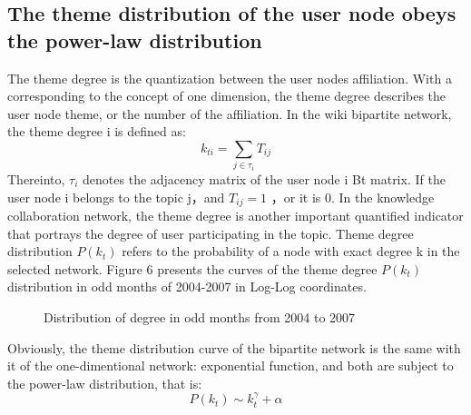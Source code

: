 \documentclass{elsarticle}
\begin{document}
\subsection{The theme distribution of the user node obeys the power-law distribution}
\label{sec:theme-distr-user}

The theme degree is the quantization between the user nodes
affiliation. With a corresponding to the concept of one dimension, the
theme degree describes the user node theme, or the number of the
affiliation. In the wiki bipartite network, the theme degree i is
defined as:
\begin{equation}
  \label{eq:1}
  k_{ti}=\sum_{j \in \tau_i} T_{ij}
\end{equation}
Thereinto, $\tau_i$ denotes the adjacency matrix of the user node i Bt
matrix. If the user node i belongs to the topic j，and $T_{ij}=1$ ，or
it is 0. In the knowledge collaboration network, the theme degree is
another important quantified indicator that portrays the degree of
user participating in the topic. Theme degree distribution $P(k_t)$
refers to the probability of a node with exact degree k in the
selected network. Figure 6 presents the curves of the theme degree
$P(k_t)$  distribution  in odd months of 2004-2007 in Log-Log
coordinates. 

\begin{figure}[htpb]
  \centering
  \subfigure[a]{
     \scalebox{0.18}{\texttt{[image: 06-1]}}
   } \quad
  \subfigure[b]{ 
       \scalebox{0.18}{\texttt{[image: 06-2]}}
   } 
  
    \subfigure[c]{
     \scalebox{0.18}{\texttt{[image: 06-3]}}
   } \quad
  \subfigure[d]{ 
       \scalebox{0.18}{\texttt{[image: 06-4]}}
   } 
  
    \subfigure[e]{
     \scalebox{0.18}{\texttt{[image: 06-5]}}
   } \quad
  \subfigure[f]{ 
       \scalebox{0.18}{\texttt{[image: 06-6]}}
   } 

    \subfigure[g]{
     \scalebox{0.18}{\texttt{[image: 06-7]}}
   } \quad
  \subfigure[h]{ 
       \scalebox{0.18}{\texttt{[image: 06-8]}}
   } 
   \caption{Distribution of degree in odd months from 2004 to 2007}
\end{figure}

Obviously, the theme distribution curve of the bipartite network is the same with it of the one-dimentional network: exponential function, and both are subject to the power-law distribution, that is: 
\begin{equation}
  \label{eq:2}
  P(k_t)\sim k_t^{\gamma}+\alpha
\end{equation}
\end{document}

